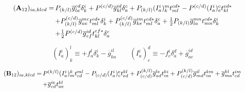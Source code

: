 \begin{subappendices}
    \begin{equation}
        \begin{array}{r@{\,}l}
            (\mathbf{A}_{12})_{ia,klcd}
            =
            &
            P_{(k/l)}
            \overline{g}_{la}^{cd}
            \delta_k^i
            +
            P^{(c/d)}
            \overline{g}_{kl}^{id}
            \delta_a^c
            +
            P_{(k/l)}
            (I_a^i)_k^m
            t_{ml}^{cd*}
            -
            P^{(c/d)}
            (I_a^i)_e^c
            t_{kl}^{ed*}
            \\[5pt]
            &
            +
            P_{(k/l)}^{(c/d)}
            \overline{g}_{ae}^{mc}
            t_{ml}^{ed*}
            \delta_k^i
            +
            P_{(k/l)}^{(c/d)}
            \overline{g}_{ke}^{im}
            t_{ml}^{ed*}
            \delta_a^c
            +
            \tfrac{1}{2}
            P_{(k/l)}
            \overline{g}_{la}^{mn}
            t_{mn}^{cd*}
            \delta_k^i
            \\[5pt]
            &
            +
            \tfrac{1}{2}
            P^{(c/d)}
            \overline{g}_{ef}^{id}
            t_{kl}^{ef*}
            \delta_a^c
        \end{array}
    \end{equation}

    \begin{equation}
        (I_a^i)_k^l
        \equiv
        +
        f_a^l
        \delta_k^i
        -
        \overline{g}_{ka}^{il}
        \qquad
        (I_a^i)_c^d
        \equiv
        -
        f_c^i
        \delta_a^d
        +
        \overline{g}_{ac}^{id}
    \end{equation}

    \begin{equation}
        \begin{array}{r@{\,}l}
            (\mathbf{B}_{12})_{ia,klcd}
            =
            &
            P^{(k/l)}
            (I_a^i)_m^k
            t_{cd}^{ml}
            -
            P_{(c/d)}
            (I_a^i)_c^e
            t_{ed}^{kl}
            +
            P_{(c/d)}^{(k/l)}
            \overline{g}_{ad}^{le}
            t_{ce}^{ki}
            +
            P_{(c/d)}^{(k/l)}
            \overline{g}_{md}^{il}
            t_{ca}^{km}
            +
            \overline{g}_{ma}^{kl}
            t_{cd}^{im}
            \\[5pt]
            &
            +
            \overline{g}_{cd}^{ie}
            t_{ae}^{kl}
        \end{array}
    \end{equation}


\end{subappendices}

